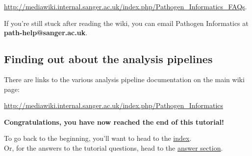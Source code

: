 \documentclass[11pt]{article}
\begin{document}
\href{http://mediawiki.internal.sanger.ac.uk/index.php/Pathogen_Informatics_FAQs\#Why_is_my_data_not_available_in_the_Pathogen_Informatics_pipelines.3F}{http://mediawiki.internal.sanger.ac.uk/index.php/Pathogen\_Informatics\_FAQs}.

If you're still stuck after reading the wiki, you can email Pathogen
Informatics at \textbf{path-help@sanger.ac.uk}.

    \hypertarget{finding-out-about-the-analysis-pipelines}{%
\subsection{Finding out about the analysis
pipelines}\label{finding-out-about-the-analysis-pipelines}}

There are links to the various analysis pipeline documentation on the
main wiki page:

\url{http://mediawiki.internal.sanger.ac.uk/index.php/Pathogen_Informatics}

    \textbf{Congratulations, you have now reached the end of this tutorial!}

To go back to the beginning, you'll want to head to the
\href{index.ipynb}{index}.\\
Or, for the answers to the tutorial questions, head to the
\href{answers.ipynb}{answer section}.


\end{document}
